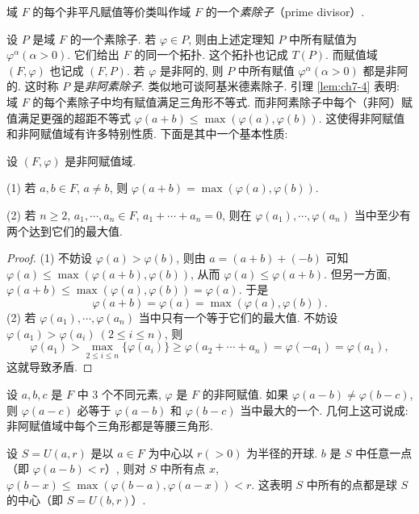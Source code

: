 \begin{definition}\label{def:ch7-4}
域 $F$ 的每个非平凡赋值等价类叫作域 $F$ 的一个\emph{素除子}（prime divisor）.
\end{definition}

设 $P$ 是域 $F$ 的一个素除子. 若 $\varphi\in P$, 则由上述定理知 $P$ 中所有赋值为 $\varphi^{\alpha}(\alpha>0)$. 它们给出 $F$ 的同一个拓扑. 这个拓扑也记成 $T(P)$. 而赋值域 $(F,\varphi)$ 也记成 $(F,P)$. 若 $\varphi$ 是非阿的, 则 $P$ 中所有赋值 $\varphi^{\alpha}(\alpha>0)$ 都是非阿的. 这时称 $P$ 是\emph{非阿素除子}. 类似地可谈阿基米德素除子. 引理 \ref{lem:ch7-4} 表明: 域 $F$ 的每个素除子中均有赋值满足三角形不等式. 而非阿素除子中每个（非阿）赋值满足更强的超距不等式 $\varphi(a+b)\leqslant\max(\varphi(a),\varphi(b))$. 这使得非阿赋值和非阿赋值域有许多特别性质. 下面是其中一个基本性质:

\begin{lemma}\label{lem:ch7-5}
设 $(F,\varphi)$ 是非阿赋值域.

(1) 若 $a,b\in F$, $a\neq b$, 则 $\varphi(a+b)=\max(\varphi(a),\varphi(b))$.

(2) 若 $n\geqslant 2$, $a_1,\cdots,a_n\in F$, $a_1+\cdots+a_n=0$, 则在 $\varphi(a_1),\cdots,\varphi(a_n)$ 当中至少有两个达到它们的最大值.
\end{lemma}

\begin{proof}
(1) 不妨设 $\varphi(a)>\varphi(b)$, 则由 $a=(a+b)+(-b)$ 可知 $\varphi(a)\leqslant\max(\varphi(a+b),\varphi(b))$, 从而 $\varphi(a)\leqslant\varphi(a+b)$. 但另一方面, $\varphi(a+b)\leqslant\max(\varphi(a),\varphi(b))=\varphi(a)$. 于是
\[
  \varphi(a+b)=\varphi(a)=\max(\varphi(a),\varphi(b)).
\]
(2) 若 $\varphi(a_1),\cdots,\varphi(a_n)$ 当中只有一个等于它们的最大值. 不妨设 $\varphi(a_1)>\varphi(a_i)\ (2\leqslant i\leqslant n)$, 则
\[
  \varphi(a_1)>\max_{2\leqslant i\leqslant n}\{\varphi(a_i)\}\geqslant\varphi(a_2+\cdots+a_n)=\varphi(-a_1)=\varphi(a_1),
\]
这就导致矛盾.
\end{proof}

\begin{remark}
设 $a,b,c$ 是 $F$ 中 $3$ 个不同元素, $\varphi$ 是 $F$ 的非阿赋值. 如果 $\varphi(a-b)\neq\varphi(b-c)$, 则 $\varphi(a-c)$ 必等于 $\varphi(a-b)$ 和 $\varphi(b-c)$ 当中最大的一个. 几何上这可说成: 非阿赋值域中每个三角形都是等腰三角形.

设 $S=U(a,r)$ 是以 $a\in F$ 为中心以 $r(>0)$ 为半径的开球. $b$ 是 $S$ 中任意一点（即 $\varphi(a-b)<r$）, 则对 $S$ 中所有点 $x$, $\varphi(b-x)\leqslant\max(\varphi(b-a),\varphi(a-x))<r$. 这表明 $S$ 中所有的点都是球 $S$ 的中心（即 $S=U(b,r)$）.
\end{remark}

